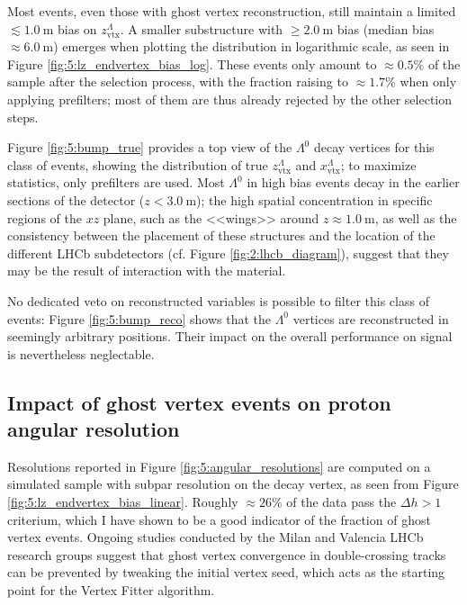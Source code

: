 Most \demonstratorshort events, even those with ghost vertex reconstruction, still maintain a limited $\lesssim \SI{1.0}{\meter}$ bias on $z_\text{vtx}^\Lambda$.
A smaller substructure with $\geq \SI{2.0}{\meter}$ bias (median bias $\approx \SI{6.0}{\meter}$) emerges when plotting the distribution in logarithmic scale, as seen in Figure \ref{fig:5:lz_endvertex_bias_log}.
These events only amount to $\approx 0.5\%$ of the sample after the selection process, with the fraction raising to $\approx 1.7\%$ when only applying prefilters;
most of them are thus already rejected by the other selection steps.

Figure \ref{fig:5:bump_true} provides a top view of the $\Lambda^0$ decay vertices for this class of events, showing the distribution of true $z_\text{vtx}^\Lambda$ and $x_\text{vtx}^\Lambda$;
to maximize statistics, only prefilters are used.
Most $\Lambda^0$ in high bias events decay in the earlier sections of the detector ($z<\SI{3.0}{\meter}$);
the high spatial concentration in specific regions of the $xz$ plane, such as the <<wings>> around $z\approx \SI{1.0}{\meter}$, as well as the consistency between the placement of these structures and the location of the different LHCb subdetectors (cf. Figure \ref{fig:2:lhcb_diagram}), suggest that they may be the result of interaction with the material.

No dedicated veto on reconstructed variables is possible to filter this class of events:
Figure \ref{fig:5:bump_reco} shows that the $\Lambda^0$ vertices are reconstructed in seemingly arbitrary positions.
Their impact on the overall performance on signal is nevertheless neglectable.

\subsection{Impact of ghost vertex events on proton angular resolution}

Resolutions reported in Figure \ref{fig:5:angular_resolutions} are computed on a simulated sample with subpar resolution on the \lz decay vertex, as seen from Figure \ref{fig:5:lz_endvertex_bias_linear}.
Roughly $\approx 26\%$ of the data pass the $\Delta h > 1$ criterium, which I have shown to be a good indicator of the fraction of ghost vertex events.
Ongoing studies conducted by the Milan and Valencia LHCb research groups suggest that ghost vertex convergence in double-crossing tracks can be prevented by tweaking the initial vertex seed, which acts as the starting point for the Vertex Fitter algorithm.


